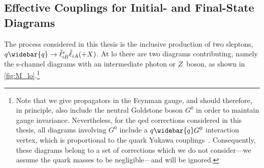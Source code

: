 \subsection{Effective Couplings for Initial- and Final-State Diagrams}
The process considered in this thesis is the inclusive production of two sleptons, $q\widebar{q}\to\slepton_{iB}^*\slepton_{iA}(+X)$.
At \gls{lo} there are two diagrams contributing, namely the s-channel diagrams with an intermediate photon or $Z$~boson, as shown in \cref{fig:M_lo}.\footnote{Note that we give propagators in the Feynman gauge, and should therefore, in principle, also include the neutral Goldstone boson $G^0$ in order to maintain gauge invariance. Nevertheless, for the \gls{qed} corrections considered in this thesis, all diagrams involving $G^0$ include a $q\widebar{q}G^0$ interaction vertex, which is proportional to the quark Yukawa couplings~\cite{Rosiek:1989sce}. Consequently, these diagrams belong to a set of corrections which we do not consider---we assume the quark masses to be negligible---and will be ignored.}

